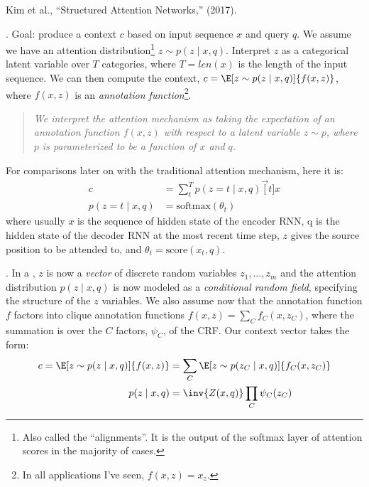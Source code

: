 \documentclass[11pt]{article}
\begin{document}
\vspace{-1em}
{\footnotesize Kim et al., ``Structured Attention Networks,'' (2017).}

\p {}. Goal: produce a context $c$ based on input sequence $x$ and query $q$. We assume we have an attention distribution\footnote{Also called the ``alignments''. It is the output of the softmax layer of attention scores in the majority of cases.} $z \sim p(z \mid x, q)$. Interpret $z$ as a categorical latent variable over $T$ categories, where $T = len(x)$ is the length of the input sequence. We can then compute the context, $c = \E[z \sim p(z \mid x, q)]{f(x, z)}$, where $f(x, z)$ is an \textit{annotation function}\footnote{In all applications I've seen, $f(x, z) = x_z$.}. 
\vspace{-0.6em}
\begin{quote}
	{\small\itshape
		We interpret the attention mechanism as taking the expectation of an annotation function $f(x, z)$ with respect to a latent variable $z \sim p$, where $p$ is parameterized to be a function of $x$ and $q$.
	}
\end{quote}
For comparisons later on with the traditional attention mechanism, here it is:
\begin{align}
c &= \sum_t^T p(z = t \mid x, q) \vec[t]{x} \label{eq:san-1} \\
p(z = t \mid x, q) &= \text{softmax}(\theta_t) 
\end{align}
where usually $x$ is the sequence of hidden state of the encoder RNN, q is the hidden state of the decoder RNN at the most recent time step, $z$ gives the source position to be attended to, and $\theta_t = \text{score}(x_t, q)$.

\myspace
\p {}. In a , $z$ is now a \textit{vector} of discrete random variables $z_1, \ldots, z_m$ and the attention distribution $p(z \mid x, q)$ is now modeled as a \textit{conditional random field}, specifying the structure of the $z$ variables. We also assume now that the annotation function $f$ factors into clique annotation functions $f(x, z) = \sum_C f_C(x, z_C)$, where the summation is over the $C$ factors, $\psi_C$, of the CRF. Our context vector takes the form:
\begin{align}
c = \E[z \sim p(z \mid x, q)]{f(x, z)} &= \sum_{C} \E[z \sim p(z_C \mid x, q)]{f_C(x, z_C)} \\
p(z \mid x, q) &= \inv{Z(x, q)} \prod_C \psi_C(z_C) 
\end{align}
\end{document}
